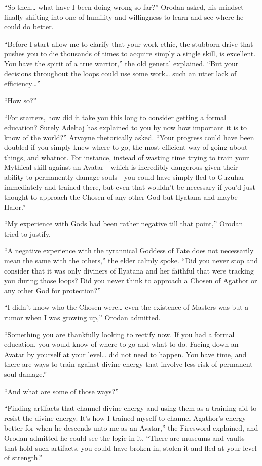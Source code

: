\documentclass[a4paper,10pt]{book}
\begin{document}
“So then… what have I been doing wrong so far?” Orodan asked, his mindset finally shifting into one of humility and willingness to learn and see where he could do better.\par
“Before I start allow me to clarify that your work ethic, the stubborn drive that pushes you to die thousands of times to acquire simply a single skill, is excellent. You have the spirit of a true warrior,” the old general explained. “But your decisions throughout the loops could use some work… such an utter lack of efficiency…”\par
“How so?”\par
“For starters, how did it take you this long to consider getting a formal education? Surely Adeltaj has explained to you by now how important it is to know of the world?” Arvayne rhetorically asked. “Your progress could have been doubled if you simply knew where to go, the most efficient way of going about things, and whatnot. For instance, instead of wasting time trying to train your Mythical skill against an Avatar - which is incredibly dangerous given their ability to permanently damage souls - you could have simply fled to Guzuhar immediately and trained there, but even that wouldn’t be necessary if you’d just thought to approach the Chosen of any other God but Ilyatana and maybe Halor.”\par
“My experience with Gods had been rather negative till that point,” Orodan tried to justify.\par
“A negative experience with the tyrannical Goddess of Fate does not necessarily mean the same with the others,” the elder calmly spoke. “Did you never stop and consider that it was only diviners of Ilyatana and her faithful that were tracking you during those loops? Did you never think to approach a Chosen of Agathor or any other God for protection?”\par
“I didn’t know who the Chosen were… even the existence of Masters was but a rumor when I was growing up,” Orodan admitted.\par
“Something you are thankfully looking to rectify now. If you had a formal education, you would know of where to go and what to do. Facing down an Avatar by yourself at your level… did not need to happen. You have time, and there are ways to train against divine energy that involve less risk of permanent soul damage.”\par
“And what are some of those ways?”\par
“Finding artifacts that channel divine energy and using them as a training aid to resist the divine energy. It’s how I trained myself to channel Agathor’s energy better for when he descends unto me as an Avatar,” the Firesword explained, and Orodan admitted he could see the logic in it. “There are museums and vaults that hold such artifacts, you could have broken in, stolen it and fled at your level of strength.”\par
\end{document}
